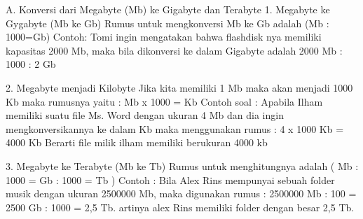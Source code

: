 A.	Konversi dari Megabyte (Mb) ke Gigabyte dan Terabyte
1.	Megabyte ke Gygabyte (Mb ke Gb)
	Rumus untuk mengkonversi Mb ke Gb adalah (Mb : 1000=Gb)
	Contoh: 
	Tomi ingin mengatakan bahwa flashdisk nya memiliki kapasitas 2000 Mb, maka bila dikonversi  ke dalam Gigabyte adalah 2000 Mb : 1000 : 2 Gb 

2.	Megabyte menjadi Kilobyte
Jika kita memiliki 1 Mb maka akan menjadi 1000 Kb maka rumusnya yaitu :
Mb x 1000 = Kb
Contoh soal :
Apabila Ilham memiliki suatu file Ms. Word dengan ukuran 4 Mb dan dia ingin mengkonversikannya ke dalam Kb maka menggunakan rumus :
4 x 1000 Kb = 4000 Kb
Berarti file milik ilham memiliki berukuran 4000 kb

3.	Megabyte ke Terabyte (Mb ke Tb)
Rumus untuk menghitungnya adalah ( Mb : 1000 = Gb : 1000 = Tb )
Contoh :
Bila Alex Rins mempunyai sebuah folder musik dengan ukuran 2500000 Mb, maka digunakan rumus : 2500000 Mb : 100 = 2500 Gb : 1000 = 2,5 Tb.
artinya alex Rins memiliki folder dengan besar 2,5 Tb.


